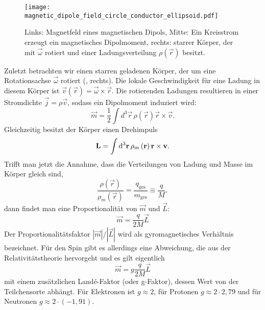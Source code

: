 \begin{figure}[htb]
	\centering
	\texttt{[image: magnetic\_dipole\_field\_circle\_conductor\_ellipsoid.pdf]}
	\caption{Links: Magnetfeld eines magnetischen Dipols, Mitte: Ein Kreisstrom erzeugt ein magnetisches Dipolmoment, rechts: starrer Körper, der mit $\vec\omega$ rotiert und einer Ladungsverteilung $\rho(\vec r)$ besitzt. }
	\label{fig:magnetic_dipole_field_circle_conductor_ellipsoid}
\end{figure}

Zuletzt betrachten wir einen starren geladenen Körper, der um eine Rotationsachse $\vec {\omega }$ rotiert (, rechts). Die lokale Geschwindigkeit für eine Ladung in diesem Körper ist $\vec {v}\left(\vec {r}\right)=\vec {\omega }\times \vec {r}$. Die rotierenden Ladungen resultieren in einer Stromdichte $\vec {j}=\rho \vec {v}$, sodass ein Dipolmoment induziert wird:
\begin{equation*}
	\vec {m}=\frac{1}{2}\int d^{3}\vec {r}\,\rho \left(\vec {r}\right)\vec {r}\times \vec {v}.
\end{equation*}
Gleichzeitig besitzt der Körper einen Drehimpuls
\begin{equation*}
	\vec {L}=\int \diffa[3]{\vec{r}}\rho _{m}\left(\vec {r}\right)\vec {r}\times \vec {v}.
\end{equation*}
Trifft man jetzt die Annahme, dass die Verteilungen von Ladung und Masse im Körper gleich sind,
\begin{equation*}
	\frac{\rho \left(\vec {r}\right)}{\rho _{m}\left(\vec {r}\right)}=\frac{q_{\mathrm{ges}}}{m_{\mathrm{ges}}}\equiv \frac{q}{M},
\end{equation*}
dann findet man eine Proportionalität von $\vec {m}$ und $\vec {L}$:
\begin{equation*}
	\vec {m}=\frac{q}{2M}\vec {L}
\end{equation*}
Der Proportionalitätsfaktor $\left| \vec {m}\right| /\left| \vec {L}\right| $ wird als gyromagnetisches Verhältnis bezeichnet. Für den Spin gibt es allerdings eine Abweichung, die aus der Relativitätstheorie hervorgeht und es gilt eigentlich
\begin{equation*}
	\vec {m}=g\frac{q}{2M}\vec {L}
\end{equation*}
mit einem zusätzlichen Landé-Faktor (oder g-Faktor), dessen Wert von der Teilchensorte abhängt. Für Elektronen ist $g\approx 2$, für Protonen $g\approx 2\cdot 2,79$ und für Neutronen $g\approx 2\cdot \left(-1,91\right)$.

